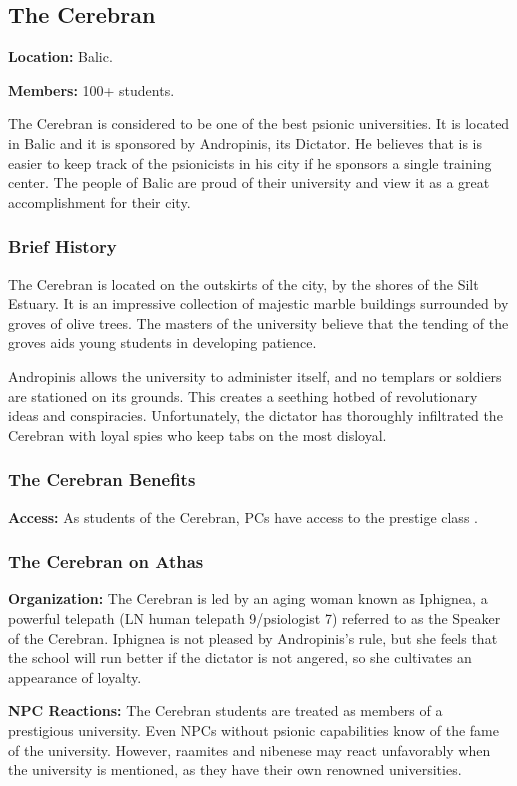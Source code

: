 \subsection{The Cerebran}
\textbf{Location:} Balic.

\textbf{Members:} 100+ students.

The Cerebran is considered to be one of the best psionic universities. It is located in Balic and it is sponsored by Andropinis, its Dictator. He believes that is is easier to keep track of the psionicists in his city if he sponsors a single training center. The people of Balic are proud of their university and view it as a great accomplishment for their city.

\subsubsection{Brief History}
The Cerebran is located on the outskirts of the city, by the shores of the Silt Estuary. It is an impressive collection of majestic marble buildings surrounded by groves of olive trees. The masters of the university believe that the tending of the groves aids young students in developing patience.

Andropinis allows the university to administer itself, and no templars or soldiers are stationed on its grounds. This creates a seething hotbed of revolutionary ideas and conspiracies. Unfortunately, the dictator has thoroughly infiltrated the Cerebran with loyal spies who keep tabs on the most disloyal.

\subsubsection{The Cerebran Benefits}
\textbf{Access:} As students of the Cerebran, PCs have access to the prestige class .

\subsubsection{The Cerebran on Athas}
\textbf{Organization:} The Cerebran is led by an aging woman known as Iphignea, a powerful telepath (LN human telepath 9/psiologist 7) referred to as the Speaker of the Cerebran. Iphignea is not pleased by Andropinis's rule, but she feels that the school will run better if the dictator is not angered, so she cultivates an appearance of loyalty.

\textbf{NPC Reactions:} The Cerebran students are treated as members of a prestigious university. Even NPCs without psionic capabilities know of the fame of the university. However, raamites and nibenese may react unfavorably when the university is mentioned, as they have their own renowned universities.

